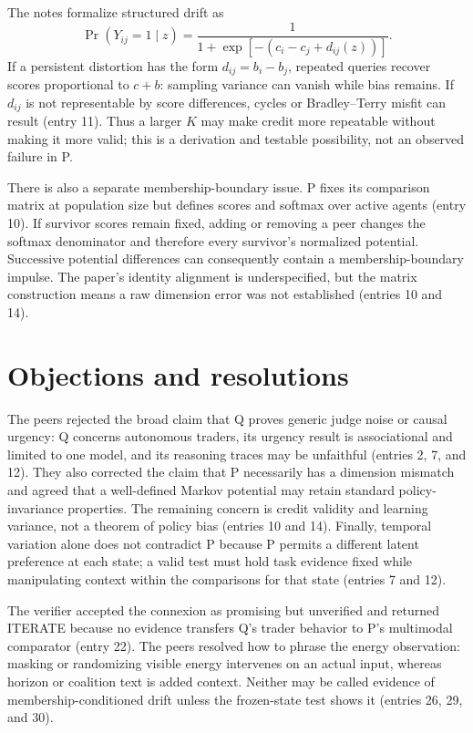 \documentclass{article}
\begin{document}
The notes formalize structured drift as
\begin{equation*}
 \Pr(Y_{ij}=1\mid z)=\frac{1}{1+\exp[-(c_i-c_j+d_{ij}(z))]}.
\end{equation*}
If a persistent distortion has the form $d_{ij}=b_i-b_j$, repeated queries
recover scores proportional to $c+b$: sampling variance can vanish while bias
remains. If $d_{ij}$ is not representable by score differences, cycles or
Bradley--Terry misfit can result (entry 11). Thus a larger $K$ may make credit
more repeatable without making it more valid; this is a derivation and testable
possibility, not an observed failure in P.

There is also a separate membership-boundary issue. P fixes its comparison
matrix at population size but defines scores and softmax over active agents
(entry 10). If survivor scores remain fixed, adding or removing a peer changes
the softmax denominator and therefore every survivor's normalized potential.
Successive potential differences can consequently contain a membership-boundary
impulse. The paper's identity alignment is underspecified, but the matrix
construction means a raw dimension error was not established (entries 10 and
14).

\section*{Objections and resolutions}
The peers rejected the broad claim that Q proves generic judge noise or causal
urgency: Q concerns autonomous traders, its urgency result is associational and
limited to one model, and its reasoning traces may be unfaithful (entries 2, 7,
and 12). They also corrected the claim that P necessarily has a dimension
mismatch and agreed that a well-defined Markov potential may retain standard
policy-invariance properties. The remaining concern is credit validity and
learning variance, not a theorem of policy bias (entries 10 and 14). Finally,
temporal variation alone does not contradict P because P permits a different
latent preference at each state; a valid test must hold task evidence fixed
while manipulating context within the comparisons for that state (entries 7
and 12).

The verifier accepted the connexion as promising but unverified and returned
ITERATE because no evidence transfers Q's trader behavior to P's multimodal
comparator (entry 22). The peers resolved how to phrase the energy observation:
masking or randomizing visible energy intervenes on an actual input, whereas
horizon or coalition text is added context. Neither may be called evidence of
membership-conditioned drift unless the frozen-state test shows it (entries 26,
29, and 30).
\end{document}
